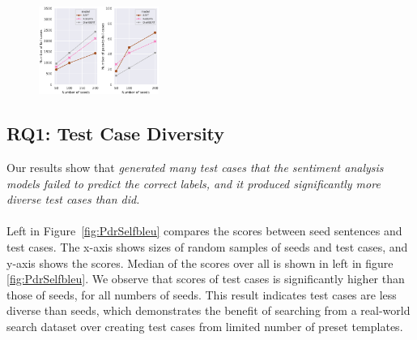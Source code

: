 \begin{figure}%
    \centering
    \includegraphics[width=0.35\textwidth]{figs/numfail-pass2fail-agg-lineplot.eps}
    \caption{\FailModelsFigCaption}
\end{figure}


\subsection{RQ1: Test Case Diversity}

Our results show that \emph{\tool generated many test cases that the sentiment analysis models failed to predict the correct labels, and it produced significantly more diverse test cases than \Cklst did.}

\paragraph*{\selfbleu} Left in Figure~\ref{fig:PdrSelfbleu} compares the \selfbleu scores between \tool seed sentences and \Cklst test cases. The x-axis shows sizes of random samples of \tool seeds and \Cklst test cases, and y-axis shows the \selfbleu scores.
Median of the \selfbleu scores over all \lcs is shown in left in figure \ref{fig:PdrSelfbleu}. We observe that \selfbleu scores of \Cklst test cases is significantly higher than those of \tool seeds, for all numbers of seeds. This result indicates \Cklst test cases are less diverse than \tool seeds, which demonstrates the benefit of searching from a real-world search dataset over creating test cases from limited number of preset templates.

